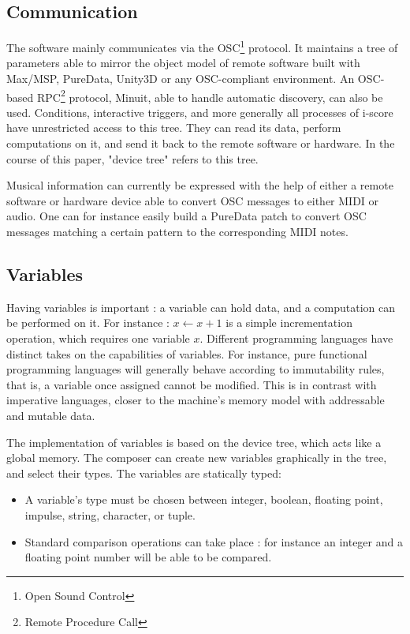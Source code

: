 \documentclass{article}
\begin{document}
\subsection{Communication}
The software mainly communicates via the OSC\footnote{Open Sound Control} protocol.
It maintains a tree of parameters able to mirror 
the object model of remote software built with Max/MSP, PureData, Unity3D or any OSC-compliant environment. 
An OSC-based RPC\footnote{Remote Procedure Call} protocol, Minuit, able to handle automatic discovery, can also be used. 
Conditions, interactive triggers, and more generally all processes of i-score have unrestricted 
access to this tree.
They can read its data, perform computations on it, and send it back to the remote software or hardware.
In the course of this paper, "device tree" refers to this tree.

Musical information can currently be expressed with the help of either a remote software or hardware device able 
to convert OSC messages to either MIDI or audio.
One can for instance easily build a PureData patch to convert OSC messages matching a certain pattern 
to the corresponding MIDI notes.

\subsection{Variables}
Having variables is important : a variable can hold data, 
and a computation can be performed on it.
For instance : $x \leftarrow x + 1$ is a simple incrementation 
operation, which requires one variable $x$.
Different programming languages have distinct takes on the 
capabilities of variables.
For instance, pure functional programming languages will generally 
behave according to immutability rules, that is, a variable once 
assigned cannot be modified.
This is in contrast with imperative languages, closer 
to the machine's memory model with addressable and mutable data.

The implementation of variables is based on the device tree, which 
acts like a global memory. 
The composer can create new variables graphically in the tree, and select their types.
The variables are statically typed: 
\begin{itemize}
    \item A variable's type must be chosen between integer, boolean, floating point, impulse, string, character, or tuple.
    \item Standard comparison operations can take place : for instance an integer and a floating point number will be able to be compared.
\end{itemize} 
\end{document}
